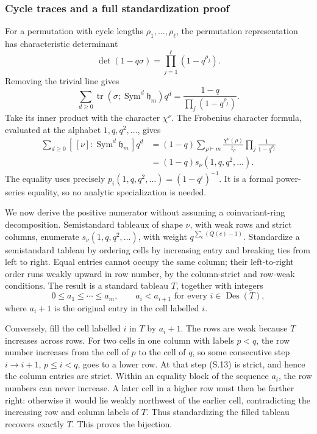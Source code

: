 \documentclass[
  10pt,
]{article}
\begin{document}
\subsubsection{Cycle traces and a full standardization
proof}\label{cycle-traces-and-a-full-standardization-proof}

For a permutation with cycle lengths \(\rho_1,\ldots,\rho_\ell\), the
permutation representation has characteristic determinant \[
\det(1-q\sigma)=\prod_{j=1}^\ell(1-q^{\rho_j}).
\] Removing the trivial line gives \[
\sum_{d\ge0}\operatorname{tr}(\sigma;\operatorname{Sym}^d\mathfrak h_m)q^d
=\frac{1-q}{\prod_j(1-q^{\rho_j})}.
\tag{S.11}
\] Take its inner product with the character \(\chi^\nu\). The Frobenius
character formula, evaluated at the alphabet \(1,q,q^2,\ldots\), gives
\[
\begin{aligned}
\sum_{d\ge0}[\,[\nu]:\operatorname{Sym}^d\mathfrak h_m\,]q^d
&=(1-q)\sum_{\rho\vdash m}\frac{\chi^\nu(\rho)}{z_\rho}
\prod_j\frac1{1-q^{\rho_j}}\\
&=(1-q)s_\nu(1,q,q^2,\ldots).
\end{aligned}
\tag{S.12}
\] The equality uses precisely \(p_i(1,q,q^2,\ldots)=(1-q^i)^{-1}\). It
is a formal power-series equality, so no analytic specialization is
needed.

We now derive the positive numerator without assuming a coinvariant-ring
decomposition. Semistandard tableaux of shape \(\nu\), with weak rows
and strict columns, enumerate \(s_\nu(1,q,q^2,\ldots)\), with weight
\(q^{\sum_c(Q(c)-1)}\). Standardize a semistandard tableau by ordering
cells by increasing entry and breaking ties from left to right. Equal
entries cannot occupy the same column; their left-to-right order runs
weakly upward in row number, by the column-strict and row-weak
conditions. The result is a standard tableau \(T\), together with
integers \[
0\le a_1\le\cdots\le a_m,
\qquad a_i<a_{i+1}\text{ for every }i\in\operatorname{Des}(T),
\tag{S.13}
\] where \(a_i+1\) is the original entry in the cell labelled \(i\).

Conversely, fill the cell labelled \(i\) in \(T\) by \(a_i+1\). The rows
are weak because \(T\) increases across rows. For two cells in one
column with labels \(p<q\), the row number increases from the cell of
\(p\) to the cell of \(q\), so some consecutive step \(i\to i+1\),
\(p\le i<q\), goes to a lower row. At that step (S.13) is strict, and
hence the column entries are strict. Within an equality block of the
sequence \(a_i\), the row numbers can never increase. A later cell in a
higher row must then be farther right: otherwise it would lie weakly
northwest of the earlier cell, contradicting the increasing row and
column labels of \(T\). Thus standardizing the filled tableau recovers
exactly \(T\). This proves the bijection.
\end{document}
